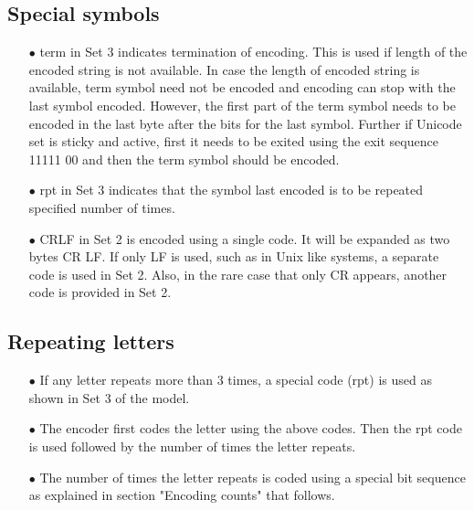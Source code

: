 \documentclass[]{article}
\begin{document}
\subsection{Special symbols}
\begin{itemize}
	\item[$\bullet$] term in Set 3 indicates termination of encoding. This is used if length of the encoded string is not available. In case the length of encoded string is available, term symbol need not be encoded and encoding can stop with the last symbol encoded. However, the first part of the term symbol needs to be encoded in the last byte after the bits for the last symbol. Further if Unicode set is sticky and active, first it needs to be exited using the exit sequence 11111 00 and then the term symbol should be encoded.
	\item[$\bullet$] rpt in Set 3 indicates that the symbol last encoded is to be repeated specified number of times.
	\item[$\bullet$] CRLF in Set 2 is encoded using a single code. It will be expanded as two bytes CR LF. If only LF is used, such as in Unix like systems, a separate code is used in Set 2. Also, in the rare case that only CR appears, another code is provided in Set 2.
\end{itemize}

\subsection{Repeating letters}
\begin{itemize}
	\item[$\bullet$] If any letter repeats more than 3 times, a special code (rpt) is used as shown in Set 3 of the model.
	\item[$\bullet$] The encoder first codes the letter using the above codes. Then the rpt code is used followed by the number of times the letter repeats.
	\item[$\bullet$] The number of times the letter repeats is coded using a special bit sequence as explained in section "Encoding counts" that follows.
\end{itemize}
\end{document}
